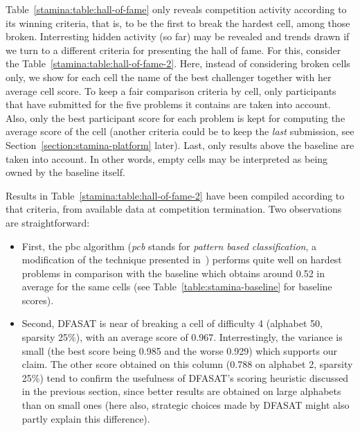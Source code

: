 Table~\ref{stamina:table:hall-of-fame} only reveals competition activity according to its winning criteria, that is, to be the first to break the hardest cell, among those broken. Interresting hidden activity (so far) may be revealed and trends drawn if we turn to a different criteria for presenting the hall of fame. For this, consider the Table~\ref{stamina:table:hall-of-fame-2}. Here, instead of considering broken cells only, we show for each cell the name of the best challenger together with her average cell score. To keep a fair comparison criteria by cell, only participants that have submitted for the five problems it contains are taken into account. Also, only the best participant score for each problem is kept for computing the average score of the cell (another criteria could be to keep the \emph{last} submission, see Section~\ref{section:stamina-platform} later). Last, only results above the baseline are taken into account. In other words, empty cells may be interpreted as being owned by the baseline itself. 

Results in Table~\ref{stamina:table:hall-of-fame-2} have been compiled according to that criteria, from available data at competition termination. Two observations are straightforward: 

\begin{itemize}

\item First, the pbc algorithm (\emph{pcb} stands for \emph{pattern based classification}, a modification of the technique presented in~\cite{Lo:2009}) performs quite well on hardest problems in comparison with the baseline which obtains around 0.52 in average for the same cells (see Table~\ref{table:stamina-baseline} for baseline scores). 

\item Second, DFASAT is near of breaking a cell of difficulty 4 (alphabet 50, sparsity 25\%), with an average score of 0.967. Interrestingly, the variance is small (the best score being 0.985 and the worse 0.929) which supports our claim. The other score obtained on this column (0.788 on alphabet 2, sparsity 25\%) tend to confirm the usefulness of DFASAT's scoring heuristic discussed in the previous section, since better results are obtained on large alphabets than on small ones (here also, strategic choices made by DFASAT might also partly explain this difference).

\end{itemize}

